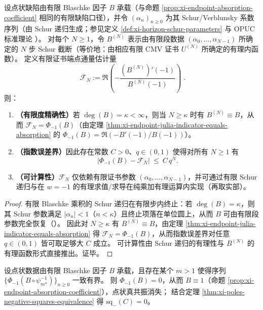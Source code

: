 \begin{theorem}\label{thm:xi-endpoint-flux-finite-cmv-computable}
设点状缺陷由有限 Blaschke 因子 \(B\) 承载（与命题 \ref{prop:xi-endpoint-absorption-coefficient} 相同的有限缺陷口径），并令 \((\alpha_n)_{n\ge 0}\) 为其 Schur/Verblunsky 系数序列（由 Schur 递归生成；参见定义 \ref{def:xi-horizon-schur-parameters} 与 OPUC 标准理论 \cite{Simon2005OPUC1}）。
对每个 \(N\ge 1\)，令 \(B^{(N)}\) 表示由有限段数据 \((\alpha_0,\dots,\alpha_{N-1})\) 所确定的 \(N\) 步 Schur 截断（等价地：由相应有限 CMV 证书 \(U^{(N)}\) 所确定的有理内函数）。
定义有限证书端点通量估计量
\[
\boxed{\;
\mathcal{F}_N:=\Re\!\left(-\frac{(B^{(N)})'(-1)}{B^{(N)}(-1)}\right)\; }.
\]
则：
\begin{enumerate}
  \item \textbf{（有限度精确性）}若 \(\deg(B)=\kappa<\infty\)，则当 \(N\ge \kappa\) 时有 \(B^{(N)}\equiv B\)，从而 \(\mathcal{F}_N=\Phi_{-1}(B)\)（由定理 \ref{thm:xi-endpoint-julia-indicator-equals-absorption} 的 \(\Phi_{-1}(B)=\Re(-B'(-1)/B(-1))\)）。
  \item \textbf{（指数误差界）}因此存在常数 \(C>0\)、\(q\in(0,1)\) 使得对所有 \(N\ge 1\) 有
  \[
  \bigl|\Phi_{-1}(B)-\mathcal{F}_N\bigr|\ \le\ C\,q^{N}.
  \]
  \item \textbf{（可计算性）}\(\mathcal{F}_N\) 仅依赖有限证书参数 \((\alpha_0,\dots,\alpha_{N-1})\)，并可通过有限 Schur 递归与在 \(w=-1\) 的有理求值/求导在纯乘加有理运算内实现（再取实部）。
\end{enumerate}
\end{theorem}

\begin{proof}
有限 Blaschke 乘积的 Schur 递归在有限步内终止：若 \(\deg(B)=\kappa\)，则其 Schur 参数满足 \(|\alpha_n|<1\)（\(n<\kappa\)）且终止项落在单位圆上，从而 \(B\) 可由有限段参数完全恢复（\cite{Simon2005OPUC1}）。
因此对 \(N\ge\kappa\) 有 \(B^{(N)}\equiv B\)，由定理 \ref{thm:xi-endpoint-julia-indicator-equals-absorption} 得 \(\mathcal{F}_N=\Phi_{-1}(B)\)，从而指数误差界对任意 \(q\in(0,1)\) 皆可取足够大 \(C\) 成立。
可计算性由 Schur 递归的有理性与 \(B^{(N)}\) 的有理函数形式直接推出。证毕。
\end{proof}

\begin{corollary}[跨尺度闭包的刚性充分条件：有界端点通量 \(\Rightarrow\) \texorpdfstring{$\kappa=0$}{kappa=0}]\label{cor:xi-bounded-flux-forces-kappa0}
设点状数据由有限 Blaschke 因子 \(B\) 承载，且存在某个 \(m>1\) 使得序列
\(\{\Phi_{-1}(B\circ\psi_{m^n}^{-1})\}_{n\ge 0}\)
一致有界。
则 \(\Phi_{-1}(B)=0\)，从而 \(B\equiv 1\)（命题 \ref{prop:xi-endpoint-absorption-coefficient}），点状真共振消失；
结合定理 \ref{thm:xi-poles-negative-squares-equivalence} 得 \(\mathrm{sq}_-(C)=0\)。
\end{corollary}

